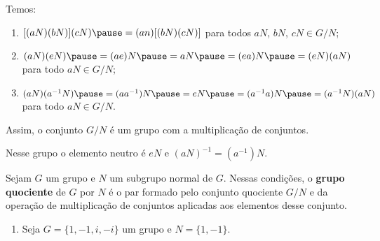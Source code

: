 \documentclass{beamer}
\begin{document}
    \begin{frame}
        Temos: \pause

        \vspace{.3cm}

        \begin{enumerate}[label={\roman*})]
            \item $[(aN)(bN)](cN) \pause = (an)[(bN)(cN)]$ \pause para todos $aN$, $bN$, $cN \in G/N$; \pause

            \vspace{.3cm}

            \item $(aN)(eN) \pause = (ae)N \pause = aN \pause = (ea)N \pause = (eN)(aN)$ \pause para todo $aN \in G/N$; \pause

            \vspace{.3cm}

            \item $(aN)(a^{-1}N) \pause = (aa^{-1})N \pause = eN \pause = (a^{-1}a)N \pause = (a^{-1}N)(aN)$ \pause para todo $aN \in G/N$. \pause

            \vspace{.3cm}
        \end{enumerate}

        Assim, o conjunto $G/N$ é um grupo com a multiplicação de conjuntos. \pause

        \vspace{.3cm}

        Nesse grupo o elemento neutro é $eN$ \pause e $(aN)^{-1} = (a^{-1})N$.
    \end{frame}

    \begin{frame}
        \begin{definicao}
            Sejam $G$ um grupo e $N$ um subgrupo normal de $G$. \pause Nessas condiç\~oes, \pause o \textbf{grupo quociente} \pause
            de $G$ por $N$ \pause é o par formado pelo conjunto quociente $G/N$ \pause e da operação de multiplicação de conjuntos
            aplicadas aos elementos desse conjunto.
        \end{definicao}
    \end{frame}

    \begin{frame}
        \begin{exemplos}
            \begin{enumerate}[label=({\arabic*})]
                \item Seja $G = \{1, -1, i, -i\}$ um grupo \pause e $N = \{1, -1\}$.

                \seti
            \end{enumerate}
        \end{exemplos}
    \end{frame}
\end{document}
